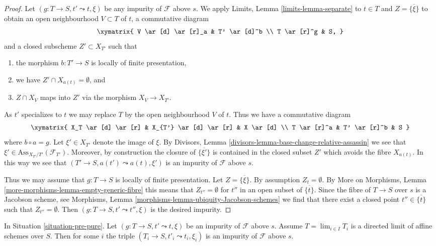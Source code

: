 \begin{proof}
Let $(g : T \to S, t' \leadsto t, \xi)$ be any impurity of
$\mathcal{F}$ above $s$. We apply
Limits, Lemma \ref{limits-lemma-separate}
to $t \in T$ and $Z = \overline{\{\xi\}}$ to obtain an open neighbourhood
$V \subset T$ of $t$, a commutative diagram
$$
\xymatrix{
V \ar[d] \ar[r]_a & T' \ar[d]^b \\
T \ar[r]^g & S,
}
$$
and a closed subscheme $Z' \subset X_{T'}$ such that
\begin{enumerate}
\item the morphism $b : T' \to S$ is locally of finite presentation,
\item we have $Z' \cap X_{a(t)} = \emptyset$, and
\item $Z \cap X_V$ maps into $Z'$ via the morphism $X_V \to X_{T'}$.
\end{enumerate}
As $t'$ specializes to $t$ we may replace $T$ by the open neighbourhood
$V$ of $t$. Thus we have a commutative diagram
$$
\xymatrix{
X_T \ar[d] \ar[r] &
X_{T'} \ar[d] \ar[r] &
X \ar[d] \\
T \ar[r]^a & T' \ar[r]^b & S
}
$$
where $b \circ a = g$. Let $\xi' \in X_{T'}$ denote the
image of $\xi$. By
Divisors, Lemma \ref{divisors-lemma-base-change-relative-assassin}
we see that $\xi' \in \text{Ass}_{X_{T'}/T'}(\mathcal{F}_{T'})$.
Moreover, by construction the closure of $\overline{\{\xi'\}}$
is contained in the closed subset $Z'$ which avoids the fibre
$X_{a(t)}$. In this way we see that $(T' \to S, a(t') \leadsto a(t), \xi')$
is an impurity of $\mathcal{F}$ above $s$.

\medskip\noindent
Thus we may assume that $g : T \to S$ is locally of finite presentation.
Let $Z = \overline{\{\xi\}}$. By assumption $Z_t = \emptyset$. By
More on Morphisms, Lemma \ref{more-morphisms-lemma-empty-generic-fibre}
this means that $Z_{t''} = \emptyset$ for $t''$ in an open subset
of $\overline{\{t\}}$. Since the fibre of
$T \to S$ over $s$ is a Jacobson scheme, see
Morphisms, Lemma \ref{morphisms-lemma-ubiquity-Jacobson-schemes}
we find that there exist a closed point $t'' \in \overline{\{t\}}$ such that
$Z_{t''} = \emptyset$. Then $(g : T \to S, t' \leadsto t'', \xi)$ is the
desired impurity.
\end{proof}

\begin{lemma}
\label{lemma-impure-limit}
In Situation \ref{situation-pre-pure}.
Let $(g : T \to S, t' \leadsto t, \xi)$ be an impurity of
$\mathcal{F}$ above $s$. Assume $T = \lim_{i \in I} T_i$
is a directed limit of affine schemes over $S$. Then for
some $i$ the triple $(T_i \to S, t'_i \leadsto t_i, \xi_i)$
is an impurity of $\mathcal{F}$ above $s$.
\end{lemma}

